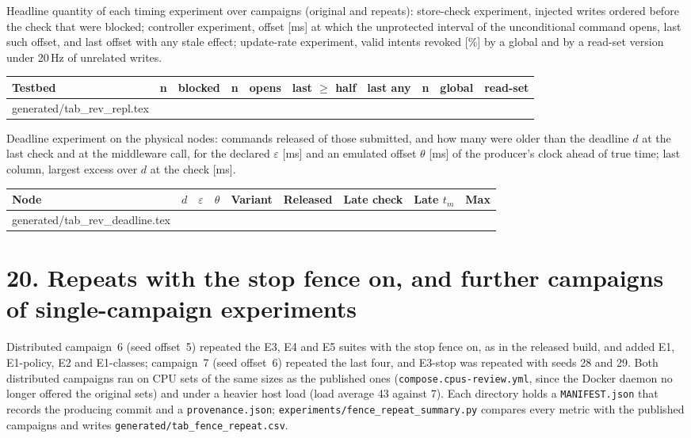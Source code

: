 \documentclass[11pt]{article}
\makeatletter
\newcommand{\gen}[1]{\@@input generated/#1.tex }
\makeatother
\begin{document}
Headline quantity of each timing experiment over campaigns (original and repeats): store-check experiment, injected writes ordered before the check that were blocked; controller experiment, offset [ms] at which the unprotected interval of the unconditional command opens, last such offset, and last offset with any stale effect; update-rate experiment, valid intents revoked [\%] by a global and by a read-set version under 20\,Hz of unrelated writes.

\begin{center}\footnotesize\setlength{\tabcolsep}{3.5pt}
\begin{tabular}{@{}lccccccccc@{}}
\toprule
Testbed & n & blocked & n & opens & last $\ge$ half & last any & n & global & read-set \\
\midrule
\gen{tab_rev_repl}
\bottomrule
\end{tabular}\end{center}

Deadline experiment on the physical nodes: commands released of those submitted, and how many were older than the deadline $d$ at the last check and at the middleware call, for the declared $\varepsilon$ [ms] and an emulated offset $\theta$ [ms] of the producer's clock ahead of true time; last column, largest excess over $d$ at the check [ms].

\begin{center}\footnotesize\setlength{\tabcolsep}{3.5pt}
\begin{tabular}{@{}lcccrccrc@{}}
\toprule
Node & $d$ & $\varepsilon$ & $\theta$ & Variant & Released & Late check & Late $t_m$ & Max \\
\midrule
\gen{tab_rev_deadline}
\bottomrule
\end{tabular}\end{center}

\section*{20. Repeats with the stop fence on, and further campaigns of single-campaign experiments}
Distributed campaign~6 (seed offset~5) repeated the E3, E4 and E5 suites with the stop fence on, as in the released build, and added E1, E1-policy, E2 and E1-classes; campaign~7 (seed offset~6) repeated the last four, and E3-stop was repeated with seeds 28 and 29. Both distributed campaigns ran on CPU sets of the same sizes as the published ones (\texttt{compose.cpus-review.yml}, since the Docker daemon no longer offered the original sets) and under a heavier host load (load average 43 against 7). Each directory holds a \texttt{MANIFEST.json} that records the producing commit and a \texttt{provenance.json}; \texttt{experiments/fence\_repeat\_summary.py} compares every metric with the published campaigns and writes \texttt{generated/tab\_fence\_repeat.csv}.
\end{document}

